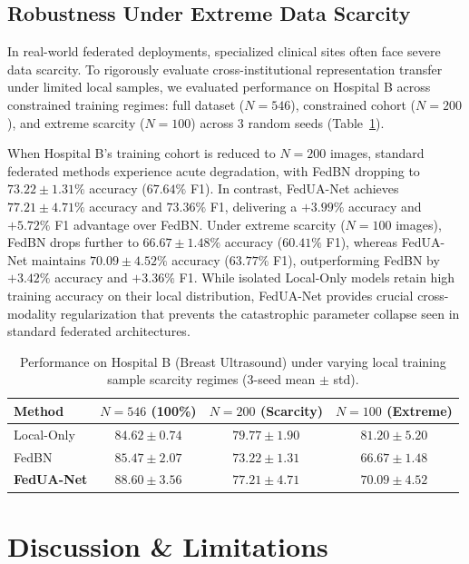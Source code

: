 \documentclass[journal]{IEEEtran}
\begin{document}
\subsection{Robustness Under Extreme Data Scarcity}
In real-world federated deployments, specialized clinical sites often face severe data scarcity. To rigorously evaluate cross-institutional representation transfer under limited local samples, we evaluated performance on Hospital B across constrained training regimes: full dataset ($N=546$), constrained cohort ($N=200$), and extreme scarcity ($N=100$) across 3 random seeds (Table~\ref{tab:scarcity}).

When Hospital B's training cohort is reduced to $N=200$ images, standard federated methods experience acute degradation, with FedBN dropping to $73.22 \pm 1.31\%$ accuracy ($67.64\%$ F1). In contrast, FedUA-Net achieves \textbf{$77.21 \pm 4.71\%$} accuracy and \textbf{$73.36\%$} F1, delivering a \textbf{$+3.99\%$} accuracy and \textbf{$+5.72\%$} F1 advantage over FedBN. Under extreme scarcity ($N=100$ images), FedBN drops further to $66.67 \pm 1.48\%$ accuracy ($60.41\%$ F1), whereas FedUA-Net maintains \textbf{$70.09 \pm 4.52\%$} accuracy ($63.77\%$ F1), outperforming FedBN by \textbf{$+3.42\%$} accuracy and \textbf{$+3.36\%$} F1. While isolated Local-Only models retain high training accuracy on their local distribution, FedUA-Net provides crucial cross-modality regularization that prevents the catastrophic parameter collapse seen in standard federated architectures.

\begin{table}[t]
\centering
\caption{Performance on Hospital B (Breast Ultrasound) under varying local training sample scarcity regimes (3-seed mean $\pm$ std).}
\label{tab:scarcity}
\footnotesize
\setlength{\tabcolsep}{2.5pt}
\begin{tabular}{lccc}
\toprule
Method & $N=546$ (100\%) & $N=200$ (Scarcity) & $N=100$ (Extreme) \\
\midrule
Local-Only & $84.62 \pm 0.74$ & $79.77 \pm 1.90$ & $81.20 \pm 5.20$ \\
FedBN & $85.47 \pm 2.07$ & $73.22 \pm 1.31$ & $66.67 \pm 1.48$ \\
\textbf{FedUA-Net} & $\mathbf{88.60 \pm 3.56}$ & $\mathbf{77.21 \pm 4.71}$ & $\mathbf{70.09 \pm 4.52}$ \\
\bottomrule
\end{tabular}
\end{table}

\section{Discussion \& Limitations}
\end{document}
